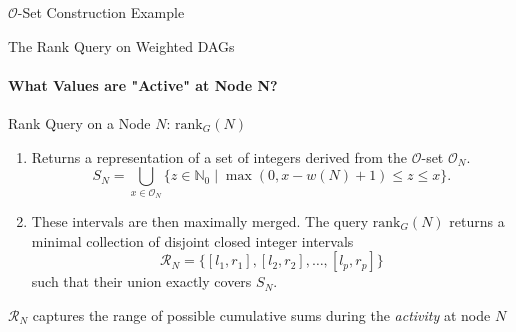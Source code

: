 \begin{frame}{$\mathcal{O}$-Set Construction Example}

\end{frame}

\begin{frame}{The Rank Query on Weighted DAGs}
    \framesubtitle{What Values are "Active" at Node N?}
    \begin{block}{Rank Query on a Node $N$: $\mathrm{rank}_G(N)$}
        \begin{enumerate}
            \item Returns a representation of a set of integers derived from the $\mathcal{O}$-set $\mathcal{O}_N$.
                  \[ S_N = \bigcup_{x \in \mathcal{O}_N} \{ z \in \mathbb{N}_0 \mid \max(0, x - w(N) + 1) \le z \le x \}. \]
                  \vspace{-1em}
                  \pause
            \item These intervals are then maximally merged. The query $\mathrm{rank}_G(N)$ returns a \alert{minimal collection of disjoint closed integer intervals}
                  \[ \mathcal{R}_N = \{[l_1, r_1], [l_2, r_2], \dots, [l_p, r_p]\} \]
                  such that their union exactly covers $S_N$.
        \end{enumerate}
    \end{block}
    $\mathcal{R}_N$ captures the range of possible cumulative sums during the \emph{activity} at node $N$

\end{frame}
